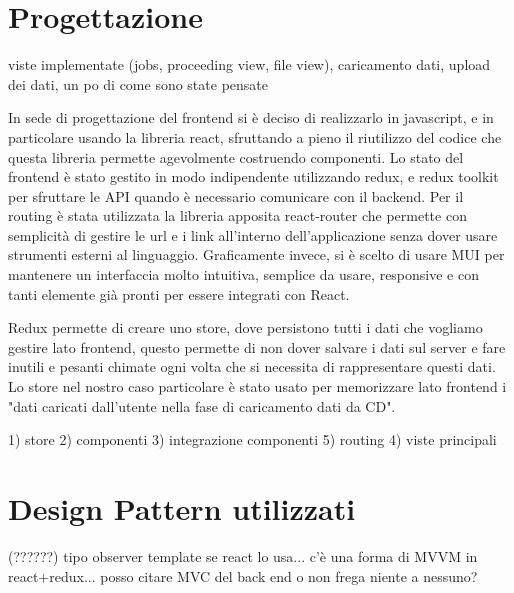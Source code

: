 \section{Progettazione}
\label{sec:progettazione}
viste implementate (jobs, proceeding view, file view), caricamento dati, upload dei dati, un po di come sono state pensate

In sede di progettazione del frontend si è deciso di realizzarlo in javascript, e in particolare usando la libreria react, sfruttando a pieno il riutilizzo del codice che questa libreria permette agevolmente costruendo componenti.
Lo stato del frontend è stato gestito in modo indipendente utilizzando redux, e redux toolkit per sfruttare le API quando è necessario comunicare con il backend.
Per il routing è stata utilizzata la libreria apposita react-router che permette con semplicità di gestire le url e i link all'interno dell'applicazione senza dover usare strumenti esterni al linguaggio.
Graficamente invece, si è scelto di usare MUI per mantenere un interfaccia molto intuitiva, semplice da usare, responsive e con tanti elemente già pronti per essere integrati con React.

Redux permette di creare uno store, dove persistono tutti i dati che vogliamo gestire lato frontend, questo permette di non dover salvare i dati sul server e fare inutili e pesanti chimate ogni volta che si necessita di rappresentare questi dati.
Lo store nel nostro caso particolare è stato usato per memorizzare lato frontend i "dati caricati dall'utente nella fase di caricamento dati da CD".

1) store
2) componenti
3) integrazione componenti
5) routing
4) viste principali

\section{Design Pattern utilizzati}
 (??????) tipo observer template se react lo usa... c'è una forma di MVVM in react+redux... posso citare MVC del back end o non frega niente a nessuno?

